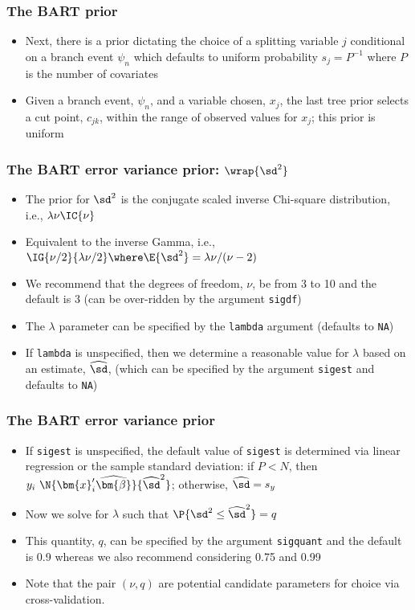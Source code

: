 \documentclass[11pt,dvipsnames,usenames,times]{beamer}
\newcommand*{\code}[1]{{\tt #1}}
\begin{document}
\begin{frame}[fragile]
\frametitle{The BART prior}
\begin{itemize}
\item Next, there is
a prior dictating the choice of a splitting variable $j$ conditional on a
branch event $\psi_n$ which defaults to uniform probability $s_j=P^{-1}$ where
$P$ is the number of covariates 
\item Given a branch event, $\psi_n$, and a
variable chosen, $x_j$, the last tree prior selects a cut point,
$c_{jk}$, within the range of observed values for $x_j$; this prior is
uniform
\end{itemize}
\end{frame}

\begin{frame}[fragile]
\frametitle{The BART error variance prior: $\wrap{\sd^2}$}
\begin{itemize}
\item The prior for $\sd^2$ is the
conjugate scaled inverse Chi-square distribution, i.e.,
$ \lambda\nu \IC{\nu}$
\item Equivalent to the inverse Gamma, i.e., 
 $\IG{\nu/2}{\lambda\nu/2} \where \E{\sd^2} = \lambda\nu/(\nu-2)$
\item We recommend that the degrees of freedom,
$\nu$, be from 3 to 10 and the default is 3 (can be over-ridden
by the argument \code{sigdf})
\item The $\lambda$ parameter can be specified by
the \code{lambda} argument (defaults to \code{NA})
\item If
\code{lambda} is unspecified, then we determine a reasonable value for
$\lambda$ based on an estimate, $\widehat\sd$, (which can be specified by
the argument \code{sigest} and defaults to \code{NA})
\end{itemize}
\end{frame}

\begin{frame}[fragile]
\frametitle{The BART error variance prior}
\begin{itemize}
\item If
\code{sigest} is unspecified, the default value of \code{sigest} is
determined via linear regression or the sample standard deviation: if
$P<N$, then $y_i ~\N{\bm{x}_i'\widehat{\bm{\beta}}}{\widehat{\sd}^2}$;
otherwise, $\widehat{\sd}=s_y$
\item Now we solve for $\lambda$ such that
$\P{\sd^2\le \widehat{\sd}^2}=q$
\item This quantity, $q$, can be specified by
the argument \code{sigquant} and the default is 0.9 whereas we also
recommend considering 0.75 and 0.99
\item Note that the pair $(\nu, q)$
are potential candidate parameters for choice via cross-validation.
\end{itemize}
\end{frame}
\end{document}
